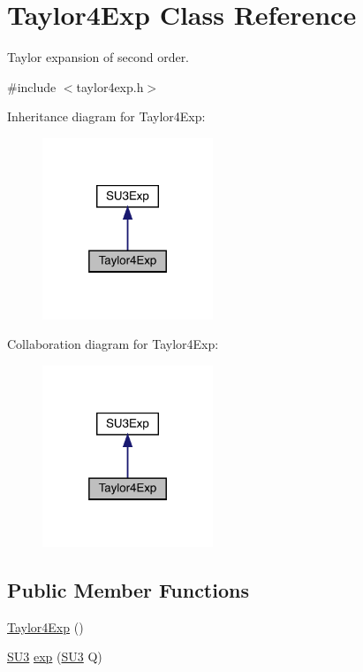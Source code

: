 \hypertarget{class_taylor4_exp}{}\section{Taylor4\+Exp Class Reference}
\label{class_taylor4_exp}


Taylor expansion of second order.  




{\ttfamily \#include $<$taylor4exp.\+h$>$}



Inheritance diagram for Taylor4\+Exp\+:\nopagebreak
\begin{figure}[H]
\begin{center}
\leavevmode
\includegraphics[width=145pt]{class_taylor4_exp__inherit__graph}
\end{center}
\end{figure}


Collaboration diagram for Taylor4\+Exp\+:\nopagebreak
\begin{figure}[H]
\begin{center}
\leavevmode
\includegraphics[width=145pt]{class_taylor4_exp__coll__graph}
\end{center}
\end{figure}
\subsection*{Public Member Functions}
\begin{DoxyCompactItemize}
\item 
\mbox{\hyperlink{class_taylor4_exp_a0eac1c3288d296110c6a5e11acc0934d}{Taylor4\+Exp}} ()
\item 
\mbox{\hyperlink{class_s_u3}{S\+U3}} \mbox{\hyperlink{class_taylor4_exp_a08f0d6d994f45b23b401b5cdc260e7ae}{exp}} (\mbox{\hyperlink{class_s_u3}{S\+U3}} Q)
\end{DoxyCompactItemize}


